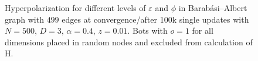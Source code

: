 \documentclass[11pt]{article}
\begin{document}
\begin{figure}[htb!]
\begin{center}
\end{center}
\caption{Hyperpolarization for different levels of $\varepsilon$ and $\phi$ in Barabási–Albert graph with $499$ edges at convergence/after 100k single updates with $N=500$, $D=3$, $\alpha=0.4$, $z=0.01$. Bots with $o=1$ for all dimensions placed in random nodes and excluded from calculation of H.}
\label{Bots contour 200}
\end{figure}
\end{document}
